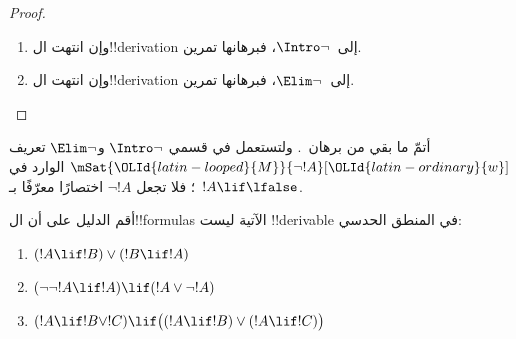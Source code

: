 \documentclass[../../../include/open-logic-section]{subfiles}
\begin{document}
\begin{proof}
\begin{enumerate}
    ولنأخذ بنقيض المطلوب: لو كان~${\OLId{greek-variable}{Gamma}} \Entails/ !A$ لكان
    نموذج~$\mModel{M}$ وعالم~${\OLId{latin-ordinary}{w}}$ يتحقق فيهما~$\mSat{{\OLId{latin-looped}{M}}}{{\OLId{greek-variable}{Gamma}}}[{\OLId{latin-ordinary}{w}}]$ و
    $\mSat/{{\OLId{latin-looped}{M}}}{!A}[{\OLId{latin-ordinary}{w}}]$. إلا أن~${\OLId{greek-variable}{Gamma}} \Entails \lfalse$ يوجب
    $\mSat{{\OLId{latin-looped}{M}}}{\lfalse}[{\OLId{latin-ordinary}{w}}]$، وهو محال، لأن التعريف يقضي بـ
    $\mSat/{{\OLId{latin-looped}{M}}}{\lfalse}[{\OLId{latin-ordinary}{w}}]$. فثبت~${\OLId{greek-variable}{Gamma}} \Entails !A$.
  \item وإن انتهت ال!!{derivation} إلى~$\Intro\lnot$، فبرهانها تمرين.
  \item وإن انتهت ال!!{derivation} إلى~$\Elim\lnot$، فبرهانها تمرين.
  \end{enumerate}
\end{proof}

\begin{prob}
  أتمّ ما بقي من برهان~. ولتستعمل في قسمي
  $\Intro\lnot$ و$\Elim\lnot$ تعريف
  $\mSat{{\OLId{latin-looped}{M}}}{\lnot !A}[{\OLId{latin-ordinary}{w}}]$ الوارد في
  ؛ فلا تجعل
  $\lnot !A$ اختصارًا معرّفًا بـ~$!A \lif \lfalse$.
\end{prob}

\begin{prob}
  أقم الدليل على أن ال!!{formula}s الآتية ليست !!{derivable} في المنطق
  الحدسي:
  \begin{enumerate}
    \item $(!A \lif !B) \lor (!B \lif !A)$
    \item $(\lnot\lnot !A \lif !A) \lif (!A \lor \lnot !A)$
    \item $(!A \lif !B \lor !C) \lif \bigl((!A \lif !B)\lor(!A \lif !C)\bigr)$
  \end{enumerate}
\end{prob}
\end{document}

